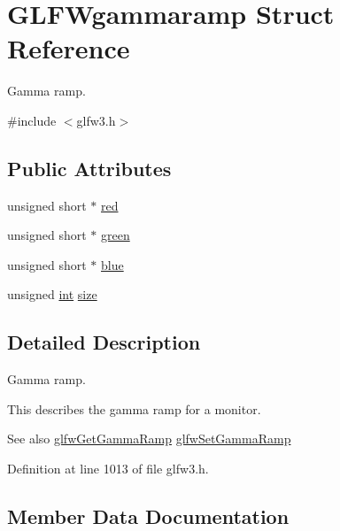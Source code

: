 \hypertarget{struct_g_l_f_wgammaramp}{}\section{G\+L\+F\+Wgammaramp Struct Reference}
\label{struct_g_l_f_wgammaramp}


Gamma ramp.  




{\ttfamily \#include $<$glfw3.\+h$>$}

\subsection*{Public Attributes}
\begin{DoxyCompactItemize}
\item 
unsigned short $\ast$ \hyperlink{struct_g_l_f_wgammaramp_a2cce5d968734b685623eef913e635138}{red}
\item 
unsigned short $\ast$ \hyperlink{struct_g_l_f_wgammaramp_affccc6f5df47820b6562d709da3a5a3a}{green}
\item 
unsigned short $\ast$ \hyperlink{struct_g_l_f_wgammaramp_acf0c836d0efe29c392fe8d1a1042744b}{blue}
\item 
unsigned \hyperlink{wglew_8h_a500a82aecba06f4550f6849b8099ca21}{int} \hyperlink{struct_g_l_f_wgammaramp_ad620e1cffbff9a32c51bca46301b59a5}{size}
\end{DoxyCompactItemize}


\subsection{Detailed Description}
Gamma ramp. 

This describes the gamma ramp for a monitor.

\begin{DoxySeeAlso}{See also}
\hyperlink{group__monitor_gaeeac9198f3c91b83440eed679441f76b}{glfw\+Get\+Gamma\+Ramp} \hyperlink{group__monitor_gac9f36a1cfa10eab191d3029ea8bc9558}{glfw\+Set\+Gamma\+Ramp} 
\end{DoxySeeAlso}


Definition at line 1013 of file glfw3.\+h.



\subsection{Member Data Documentation}
\hypertarget{struct_g_l_f_wgammaramp_acf0c836d0efe29c392fe8d1a1042744b}{}
